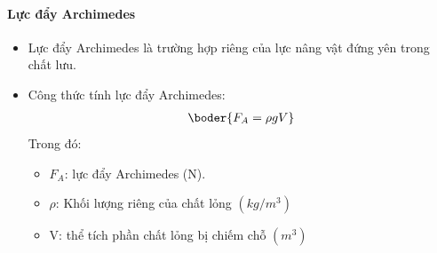\paragraph{Lực đẩy Archimedes}
\begin{itemize}
\item Lực đẩy Archimedes là trường hợp riêng của lực nâng vật đứng yên trong chất lưu.
\item Công thức tính lực đẩy Archimedes: 
\begin{align*}
\boder{F_A=\rho g V}
\end{align*}
Trong đó:
\begin{itemize}
\item $F_A$: lực đẩy Archimedes (N).
\item $\rho$: Khối lượng riêng của chất lỏng $(kg/m^3)$
\item V: thể tích phần chất lỏng bị chiếm chỗ $(m^3)$
\end{itemize}
\end{itemize}	



